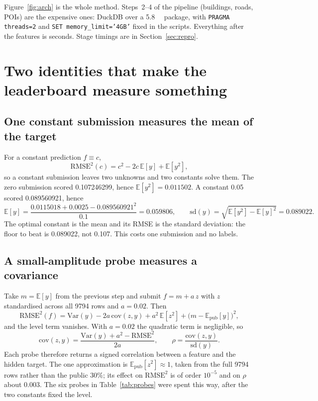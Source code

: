 \documentclass[a4paper]{article}
\newcommand{\R}{\mathrm{RMSE}}
\begin{document}
Figure~\ref{fig:arch} is the whole method. Steps~2--4 of the pipeline (buildings, roads,
POIs) are the expensive ones: DuckDB over a \SI{5.8}{\giga\byte} package, with
\texttt{PRAGMA threads=2} and \texttt{SET memory\_limit='4GB'} fixed in the scripts.
Everything after
the features is seconds. Stage timings are in Section~\ref{sec:repro}.

\section{Two identities that make the leaderboard measure something}
\label{sec:identities}

\subsection{One constant submission measures the mean of the target}

For a constant prediction $f\equiv c$,
\begin{equation}
\R^2(c) = c^2 - 2c\,\mathbb{E}[y] + \mathbb{E}[y^2],
\end{equation}
so a constant submission leaves two unknowns and two constants solve them. The zero
submission scored \num{0.107246299}, hence $\mathbb{E}[y^2]=\num{0.011502}$. A constant
\num{0.05} scored \num{0.089560921}, hence
\[
\mathbb{E}[y] = \frac{0.0115018 + 0.0025 - 0.089560921^2}{0.1} = \num{0.059806},
\qquad \mathrm{sd}(y) = \sqrt{\mathbb{E}[y^2]-\mathbb{E}[y]^2} = \num{0.089022}.
\]
The optimal constant is the mean and its RMSE is the standard deviation: the floor to beat
is \num{0.089022}, not \num{0.107}. This costs one submission and no labels.

\subsection{A small-amplitude probe measures a covariance}

Take $m=\mathbb{E}[y]$ from the previous step and submit $f = m + a\,z$ with $z$ standardised
across all \num{9794} rows and $a=\num{0.02}$. Then
\begin{equation}
\R^2(f) = \mathrm{Var}(y) - 2a\,\mathrm{cov}(z,y) + a^2\,\mathbb{E}[z^2] + \big(m-\mathbb{E}_{\text{pub}}[y]\big)^2 ,
\end{equation}
and the level term vanishes. With $a=0.02$ the quadratic term is negligible, so
\[
\mathrm{cov}(z,y) = \frac{\mathrm{Var}(y) + a^2 - \R^2}{2a},
\qquad \rho = \frac{\mathrm{cov}(z,y)}{\mathrm{sd}(y)} .
\]
Each probe therefore returns a signed correlation between a feature and the hidden target.
The one approximation is $\mathbb{E}_{\text{pub}}[z^2]\approx 1$, taken from the full
\num{9794} rows rather than the public 30\%; its effect on $\R^2$ is of order $10^{-5}$ and on
$\rho$ about \num{0.003}. The six probes in Table~\ref{tab:probes} were spent this way, after the two constants fixed the level.
\end{document}
